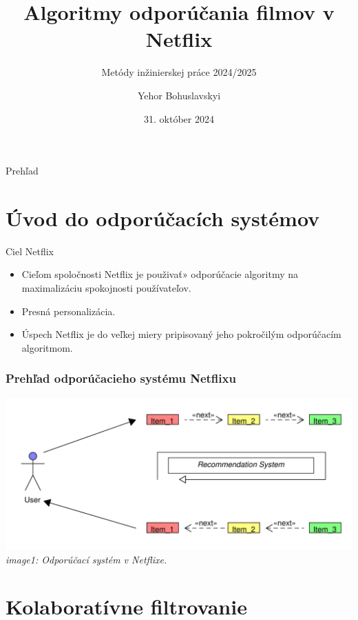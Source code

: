\documentclass{beamer}
\title{Algoritmy odporúčania filmov v Netflix}
\subtitle{\vspace{3mm} Metódy inžinierskej práce 2024/2025}
\author{Yehor Bohuslavskyi}
\institute{Slovenská technická univerzita v Bratislave}
\date{31. október 2024}
\begin{document}
\begin{frame}
    \titlepage
\end{frame}

\begin{frame}{Prehľad}
    \tableofcontents
\end{frame}

\section{Úvod do odporúčacích systémov}

\begin{frame}{Ciel Netflix}
    \begin{itemize}
        \item Cieľom spoločnosti Netflix je použivať» odporúčacie algoritmy na maximalizáciu spokojnosti používateľov.
        \item Presná personalizácia.
        \item Úspech Netflix je do veľkej miery pripisovaný jeho pokročilým odporúčacím algoritmom.
    \end{itemize}
\end{frame}


\begin{frame}
    \frametitle{Prehľad odporúčacieho systému Netflixu}
    \centering
    \includegraphics[width=1\textwidth]{Images_tables/RecommendationSystem_pdf.pdf}
    \vspace{1em}
    \textit{image1: Odporúčací systém v Netflixe.}
\end{frame}


\section{Kolaboratívne filtrovanie}
\end{document}
